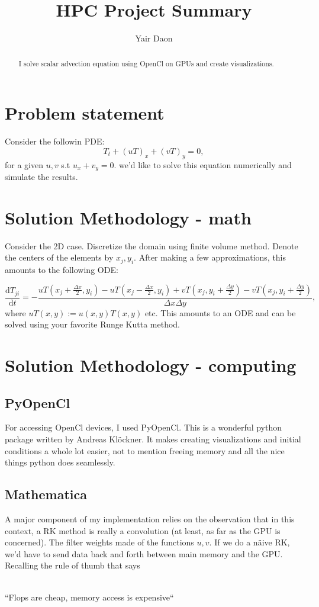 \documentclass[paper=a4, fontsize=11pt]{scrartcl} %
\title{HPC Project Summary}
\author{Yair Daon}
\date{}
\numberwithin{equation}{section} %
\numberwithin{figure}{section} %
\numberwithin{table}{section} %
\newcommand{\dd}{\text{d}}
\begin{document}
\maketitle
\begin{abstract}
I solve scalar advection equation using OpenCl on GPUs and create visualizations.
\end{abstract}
\section{Problem statement}
Consider the followin PDE:
$$
T_{t} + (uT)_x + (vT)_y = 0,
$$
for a given $u,v$ s.t $u_x + v_y = 0$.
we'd like to solve this equation numerically and simulate the results.


\section{Solution Methodology - math}
Consider the 2D case.
 Discretize the domain using finite volume method. 
Denote the centers of the elements by $x_j, y_i$. 
After making a few approximations, this amounts to the following ODE:

$$
\frac{\dd T_{ji}}{\dd t} = -\frac{uT(x_j + \frac{\Delta x}{2},y_i) - uT(x_j - \frac{\Delta x}{2},y_i) +
				  vT(x_j,y_i + \frac{\Delta y}{2}) - vT(x_j,y_i + \frac{\Delta y}{2}) }{\Delta x\Delta y},
$$
where $uT(x,y) := u(x,y)T(x,y)$ etc.
This amounts to an ODE and can be solved using your favorite Runge Kutta method.

\section{Solution Methodology - computing}

\subsection{PyOpenCl}
For accessing OpenCl devices, I used PyOpenCl. This is a wonderful python package written by Andreas Kl\"ockner. 
It makes creating visualizations and initial conditions a whole lot easier, not to 
mention freeing memory and all the nice things python does seamlessly.

\subsection{Mathematica} 
A major component of my implementation relies on the observation that in this context, a RK method is really a convolution
 (at least, as far as the GPU is concerned). The filter weights made of the functions $u,v$. If we do a n\"aive RK, we'd have to
send data back and forth between main memory and the GPU. Recalling the rule of thumb that says 
\\
\\
\centerline{\Large{``Flops are cheap, memory access is expensive``}}
\\
\end{document}
